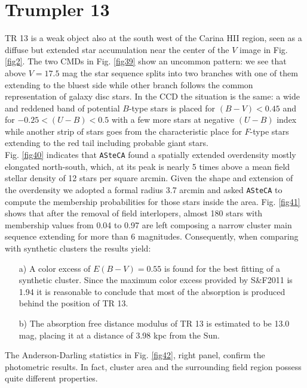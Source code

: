 \documentclass[draft]{aa}
\begin{document}
\section{Trumpler 13}

TR 13 is a weak object also at the south west of the Carina HII
region, seen as a diffuse but extended star accumulation near the center of the
$V$ image in Fig. \ref{fig2}. The two CMDs in Fig. \ref{fig39} show an uncommon
pattern: we see that above $V = 17.5$ mag the star sequence splits into two
branches with one of them extending to the bluest side while other branch
follows the common representation of galaxy disc stars.
In the CCD the situation is the same: a wide and reddened band of potential
$B$-type stars is placed for $(B-V)<0.45$ and for $-0.25<(U-B)<0.5$ with a few
more stars at negative $(U-B)$ index while another strip of stars goes from the
characteristic place for $F$-type stars extending to the red tail including
probable giant stars.\\

Fig. \ref{fig40} indicates that \texttt{ASteCA} found a spatially extended
overdensity mostly elongated north-south, which, at its peak is nearly 5 times
above a mean field stellar density of 12 stars per square arcmin. Given the
shape and extension of the overdensity we adopted a formal radius 3.7 arcmin and
asked \texttt{ASteCA} to compute the membership probabilities for those stars
inside the area. Fig. \ref{fig41} shows that after the removal of field
interlopers, almost 180 stars with membership values from 0.04 to 0.97 are left
composing a narrow cluster main sequence extending for more than 6 magnitudes.
Consequently, when comparing with synthetic clusters the results yield:

\begin{itemize}
\item [a)] A color excess of $E(B-V)= 0.55$ is found for the best fitting of
a synthetic cluster. Since the maximum color excess provided by S\&F2011
is 1.94 it is reasonable to conclude that most of the absorption is produced
behind the position of TR 13.
\item [b)] The absorption free distance modulus of TR 13 is estimated to be
13.0 mag, placing it at a distance of 3.98 kpc from the Sun.
\end{itemize}

The Anderson-Darling statistics in Fig. \ref{fig42}, right panel, confirm the
photometric results. In fact, cluster area and the surrounding field region
possess quite different properties.\\
\end{document}
